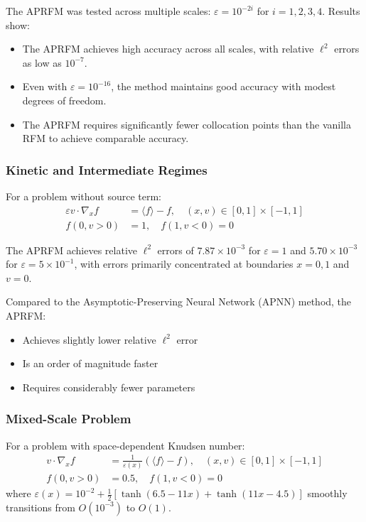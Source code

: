 \documentclass[11pt]{article}
\begin{document}
The APRFM was tested across multiple scales: $\varepsilon = 10^{-2i}$ for $i = 1,2,3,4$. Results show:
\begin{itemize}
    \item The APRFM achieves high accuracy across all scales, with relative $\ell^2$ errors as low as $10^{-7}$.
    \item Even with $\varepsilon = 10^{-16}$, the method maintains good accuracy with modest degrees of freedom.
    \item The APRFM requires significantly fewer collocation points than the vanilla RFM to achieve comparable accuracy.
\end{itemize}

\subsubsection{Kinetic and Intermediate Regimes}

For a problem without source term:
\begin{align}
\varepsilon v \cdot \nabla_x f &= \langle f \rangle - f, \quad (x,v) \in [0,1] \times [-1,1]\\
f(0, v > 0) &= 1, \quad f(1, v < 0) = 0
\end{align}

The APRFM achieves relative $\ell^2$ errors of $7.87 \times 10^{-3}$ for $\varepsilon = 1$ and $5.70 \times 10^{-3}$ for $\varepsilon = 5 \times 10^{-1}$, with errors primarily concentrated at boundaries $x=0,1$ and $v=0$.

Compared to the Asymptotic-Preserving Neural Network (APNN) method, the APRFM:
\begin{itemize}
    \item Achieves slightly lower relative $\ell^2$ error
    \item Is an order of magnitude faster
    \item Requires considerably fewer parameters
\end{itemize}

\subsubsection{Mixed-Scale Problem}

For a problem with space-dependent Knudsen number:
\begin{align}
v \cdot \nabla_x f &= \frac{1}{\varepsilon(x)}(\langle f \rangle - f), \quad (x,v) \in [0,1] \times [-1,1]\\
f(0, v > 0) &= 0.5, \quad f(1, v < 0) = 0
\end{align}
where $\varepsilon(x) = 10^{-2} + \frac{1}{2}[\tanh(6.5-11x) + \tanh(11x-4.5)]$ smoothly transitions from $O(10^{-3})$ to $O(1)$.
\end{document}
